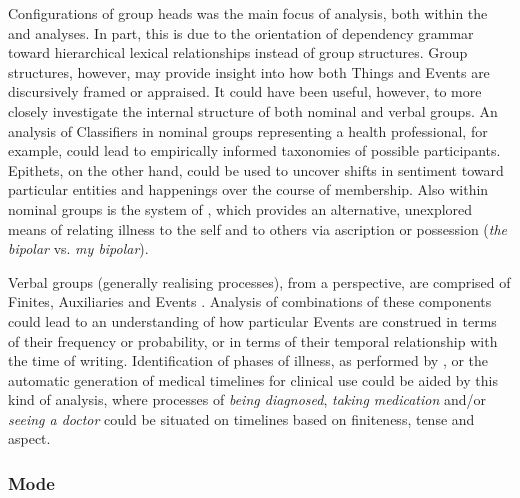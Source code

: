 Configurations of group heads was the main focus of analysis, both within the  and  analyses. In part, this is due to the orientation of dependency grammar toward hierarchical lexical relationships instead of group structures. Group structures, however, may provide insight into how both Things and Events are discursively framed or appraised. It could have been useful, however, to more closely investigate the internal structure of both nominal and verbal groups. An analysis of Classifiers in nominal groups representing a health professional, for example, could lead to empirically informed taxonomies of possible participants. Epithets, on the other hand, could be used to uncover shifts in sentiment toward particular entities and happenings over the course of membership. Also within nominal groups is the system of , which provides an alternative, unexplored means of relating illness to the self and to others via ascription or possession (\emph{the bipolar} vs. \emph{my bipolar}).

Verbal groups (generally realising processes), from a  perspective, are comprised of Finites, Auxiliaries and Events \cite{halliday_introduction_2004}. Analysis of combinations of these components could lead to an understanding of how particular Events are construed in terms of their frequency or probability, or in terms of their temporal relationship with the time of writing. Identification of phases of illness, as performed by \textcite{maclean_forum77:_2015}, or the automatic generation of medical timelines for clinical use \cite{raghavan_medical_2014} could be aided by this kind of analysis, where processes of \emph{being diagnosed}, \emph{taking medication} and\slash or \emph{seeing a doctor} could be situated on timelines based on finiteness, tense and aspect.

\subsubsection*{Mode} \label{sect:limitation-mode}

